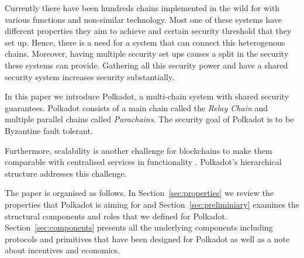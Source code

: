 Currently there have been hundreds chains implemented in the wild for with various functions and non-similar technology.
Most one of these systems have different properties they aim to achieve and certain security threshold that they set up.
Hence, there is a need for a system that can connect this heterogenous chains.
Moreover, having multiple security set ups causes a split in the security these systems can provide.
Gathering all this security power and have a shared security system increases security substantially.

In this paper we introduce Polkadot, a multi-chain system with shared security guarantees.
Polkadot consists of a main chain called the \emph{Relay Chain} and multiple parallel chains called \emph{Parachains}.
The security goal of Polkadot is to be Byzantine fault tolerant.

Furthermore, scalability is another challenge for blockchains to make them comparable with centralised services in functionality .
Polkadot's hierarchical structure addresses this challenge.

The paper is organised as follows. In Section~\ref{sec:properties} we review the properties that Polkadot is aiming for and Section~\ref{sec:preliminiary} examines the structural components and roles that we defined for Polkadot.
Section~\ref{sec:components} presents all the underlying components including protocols and primitives that have been designed for Polkadot as well as a note about incentives and economics.

